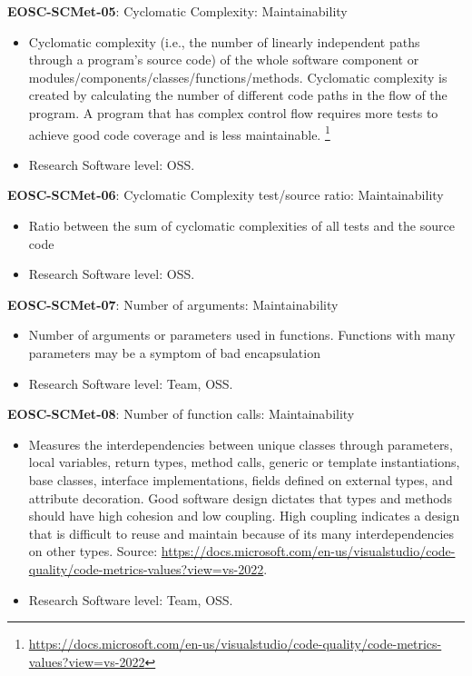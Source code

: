 \textbf{EOSC-SCMet-05}: Cyclomatic Complexity: Maintainability

\begin{itemize}
    \item Cyclomatic complexity (i.e.,  the number of linearly independent paths through a program's source code) of the whole software component or modules/components/classes/functions/methods. Cyclomatic complexity is created by calculating the number of different code paths in the flow of the program. A program that has complex control flow requires more tests to achieve good code coverage and is less maintainable. \footnote{\url{https://docs.microsoft.com/en-us/visualstudio/code-quality/code-metrics-values?view=vs-2022}}~\cite{srisopha_software_2018,montagud_systematic_2012,baggen_standardized_2012,nagappan_early_2005}
    \item Research Software level: OSS.
\end{itemize}

\textbf{EOSC-SCMet-06}: Cyclomatic Complexity test/source ratio: Maintainability

\begin{itemize}
    \item Ratio between the sum of cyclomatic complexities of all tests and the source code~\cite{nagappan_early_2005}
    \item Research Software level: OSS.
\end{itemize}

\textbf{EOSC-SCMet-07}: Number of arguments: Maintainability

\begin{itemize}
    \item Number of arguments or parameters used in functions. Functions with many parameters may be a symptom of bad encapsulation~\cite{baggen_standardized_2012,ogasawara_experiences_1996}
    \item Research Software level: Team, OSS.
\end{itemize}

\textbf{EOSC-SCMet-08}: Number of function calls: Maintainability

\begin{itemize}
    \item Measures the interdependencies between unique classes through parameters, local variables, return types, method calls, generic or template instantiations, base classes, interface implementations, fields defined on external types, and attribute decoration. Good software design dictates that types and methods should have high cohesion and low coupling. High coupling indicates a design that is difficult to reuse and maintain because of its many interdependencies on other types. Source: \url{https://docs.microsoft.com/en-us/visualstudio/code-quality/code-metrics-values?view=vs-2022}.~\cite{montagud_systematic_2012,ogasawara_experiences_1996}
    \item Research Software level: Team, OSS.
\end{itemize}

